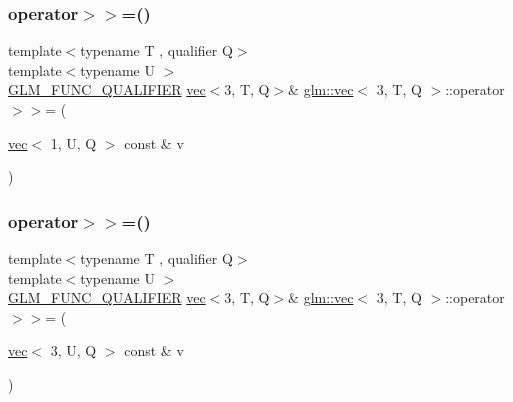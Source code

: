 \mbox{\label{structglm_1_1vec_3_013_00_01_t_00_01_q_01_4_afa71288540c821e11e3f316c16ed1274}} 
\subsubsection{\texorpdfstring{operator$>$$>$=()}{operator>>=()}\hspace{0.1cm}{\footnotesize\ttfamily [5/6]}}
{\footnotesize\ttfamily template$<$typename T , qualifier Q$>$ \\
template$<$typename U $>$ \\
\mbox{\hyperlink{setup_8hpp_a33fdea6f91c5f834105f7415e2a64407}{G\+L\+M\+\_\+\+F\+U\+N\+C\+\_\+\+Q\+U\+A\+L\+I\+F\+I\+ER}} \mbox{\hyperlink{structglm_1_1vec}{vec}}$<$3, T, Q$>$\& \mbox{\hyperlink{structglm_1_1vec}{glm\+::vec}}$<$ 3, T, Q $>$\+::operator$>$$>$= (\begin{DoxyParamCaption}\item[{\mbox{\hyperlink{structglm_1_1vec}{vec}}$<$ 1, U, Q $>$ const \&}]{v }\end{DoxyParamCaption})}

\mbox{\label{structglm_1_1vec_3_013_00_01_t_00_01_q_01_4_a62459f7f3447a3022b4079f62a719824}} 
\subsubsection{\texorpdfstring{operator$>$$>$=()}{operator>>=()}\hspace{0.1cm}{\footnotesize\ttfamily [6/6]}}
{\footnotesize\ttfamily template$<$typename T , qualifier Q$>$ \\
template$<$typename U $>$ \\
\mbox{\hyperlink{setup_8hpp_a33fdea6f91c5f834105f7415e2a64407}{G\+L\+M\+\_\+\+F\+U\+N\+C\+\_\+\+Q\+U\+A\+L\+I\+F\+I\+ER}} \mbox{\hyperlink{structglm_1_1vec}{vec}}$<$3, T, Q$>$\& \mbox{\hyperlink{structglm_1_1vec}{glm\+::vec}}$<$ 3, T, Q $>$\+::operator$>$$>$= (\begin{DoxyParamCaption}\item[{\mbox{\hyperlink{structglm_1_1vec}{vec}}$<$ 3, U, Q $>$ const \&}]{v }\end{DoxyParamCaption})}

